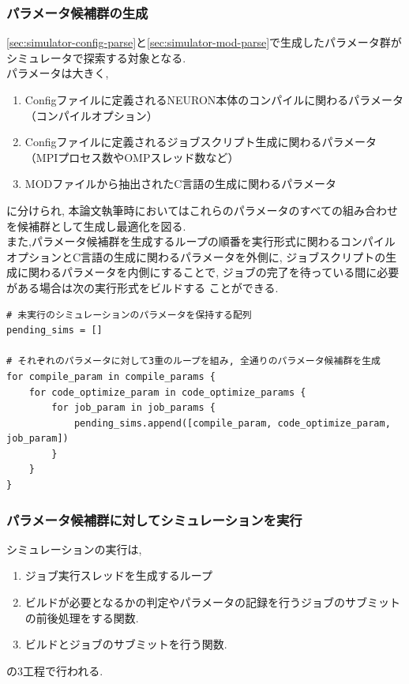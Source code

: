 \subsubsection{パラメータ候補群の生成}
\ref{sec:simulator-config-parse}と\ref{sec:simulator-mod-parse}で生成したパラメータ群がシミュレータで探索する対象となる.\\
パラメータは大きく,
\begin{enumerate}
\item Configファイルに定義されるNEURON本体のコンパイルに関わるパラメータ（コンパイルオプション）
\item Configファイルに定義されるジョブスクリプト生成に関わるパラメータ（MPIプロセス数やOMPスレッド数など）
\item MODファイルから抽出されたC言語の生成に関わるパラメータ
\end{enumerate}
に分けられ, 本論文執筆時においてはこれらのパラメータのすべての組み合わせを候補群として生成し最適化を図る.\\
また,パラメータ候補群を生成するループの順番を実行形式に関わるコンパイルオプションとC言語の生成に関わるパラメータを外側に,
ジョブスクリプトの生成に関わるパラメータを内側にすることで, ジョブの完了を待っている間に必要がある場合は次の実行形式をビルドする
ことができる.\\
{\footnotesize
\begin{lstlisting}[caption=パラメータ候補の生成　疑似コード,frame=single]
# 未実行のシミュレーションのパラメータを保持する配列
pending_sims = []

# それぞれのパラメータに対して3重のループを組み, 全通りのパラメータ候補群を生成
for compile_param in compile_params {
    for code_optimize_param in code_optimize_params {
        for job_param in job_params {
            pending_sims.append([compile_param, code_optimize_param, job_param])
        }
    }
}
\end{lstlisting}
}

\subsubsection{パラメータ候補群に対してシミュレーションを実行}
シミュレーションの実行は,
\begin{enumerate}
\item ジョブ実行スレッドを生成するループ
\item ビルドが必要となるかの判定やパラメータの記録を行うジョブのサブミットの前後処理をする関数.
\item ビルドとジョブのサブミットを行う関数.
\end{enumerate}
の3工程で行われる.\\

